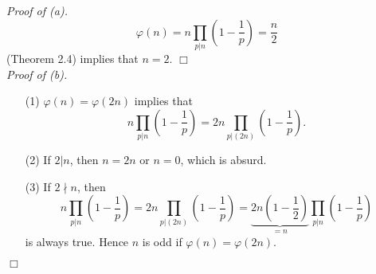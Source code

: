 \documentclass{article}
\begin{document}
\emph{Proof of (a).}
  \[
    \varphi(n) = n \prod_{p|n}\left( 1 - \frac{1}{p} \right) = \frac{n}{2}
  \]
  (Theorem 2.4) implies that $n = 2$.
$\Box$ \\



\emph{Proof of (b).}
\begin{enumerate}
\item[(1)]
  $\varphi(n) = \varphi(2n)$ implies that
  \[
    n \prod_{p|n}\left( 1 - \frac{1}{p} \right)
    = 2n \prod_{p|(2n)}\left( 1 - \frac{1}{p} \right).
  \]

\item[(2)]
  If $2 | n$, then $n = 2n$ or $n = 0$, which is absurd.

\item[(3)]
  If $2 \nmid n$, then
  \[
    n \prod_{p|n}\left( 1 - \frac{1}{p} \right)
    = 2n \prod_{p|(2n)}\left( 1 - \frac{1}{p} \right)
    = \underbrace{2n \left( 1 - \frac{1}{2} \right)}_{= n}
      \prod_{p|n}\left( 1 - \frac{1}{p} \right)
  \]
  is always true.
  Hence $n$ is odd if $\varphi(n) = \varphi(2n)$.
\end{enumerate}
$\Box$ \\
\end{document}
